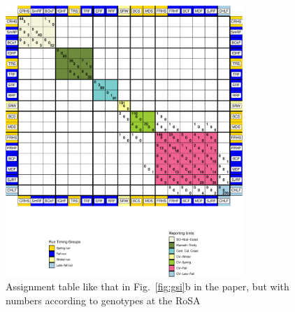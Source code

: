 \begin{figure}
\begin{center}
\includegraphics[width=0.8\textwidth]{images/rosa-gsi-table-crop.pdf}
\end{center}
\caption[Assignment table by RoSA genotype]{\footnotesize Assignment table
like that in Fig.~\ref{fig:gsi}b in the paper, but with numbers according to genotypes
at the RoSA}
\label{fig:rosa-gsi}
\end{figure}




